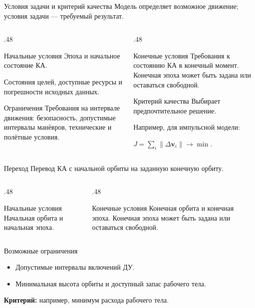 \documentclass[11pt,aspectratio=169,t]{beamer}
\begin{document}
\begin{frame}{Условия задачи и критерий качества}
Модель определяет возможное движение; условия задачи --- требуемый результат.
\begin{columns}[T,onlytextwidth]
\begin{column}{.48\textwidth}
\begin{block}{Начальные условия}
Эпоха и начальное состояние КА.\par
Состояния целей, доступные ресурсы и погрешности исходных данных.
\end{block}
\begin{block}{Ограничения}
Требования на интервале движения: безопасность, допустимые интервалы манёвров, технические и полётные условия.
\end{block}
\end{column}
\begin{column}{.48\textwidth}
\begin{block}{Конечные условия}
Требования к состоянию КА в конечный момент. Конечная эпоха может быть задана или оставаться свободной.
\end{block}
\begin{block}{Критерий качества}
Выбирает предпочтительное решение.\par
Например, для импульсной модели:\par
$\displaystyle J=\sum_i\|\Delta\mathbf v_i\|\to\min$.
\end{block}
\end{column}
\end{columns}
\end{frame}

\begin{frame}{Переход}
Перевод КА с начальной орбиты на заданную конечную орбиту.
\begin{columns}[T,onlytextwidth]
\begin{column}{.48\textwidth}
\begin{block}{Начальные условия}
\justifying
Начальная орбита и начальная эпоха.
\end{block}
\end{column}
\begin{column}{.48\textwidth}
\begin{block}{Конечные условия}
\justifying
Конечная орбита и конечная эпоха. Конечная эпоха может быть задана или оставаться свободной.
\end{block}
\end{column}
\end{columns}
\begin{block}{Возможные ограничения}
\begin{itemize}
\item Допустимые интервалы включений ДУ.
\item Минимальная высота орбиты и доступный запас рабочего тела.
\end{itemize}
\end{block}
\textbf{Критерий:} например, минимум расхода рабочего тела.
\end{frame}
\end{document}
